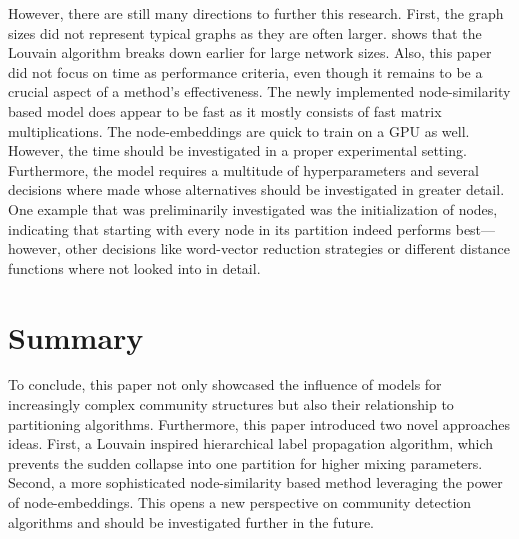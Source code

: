 \documentclass[11pt, twocolumn]{article}
\begin{document}
However, there are still many directions to further this research. First, the graph sizes did not represent typical graphs as they are often larger. \citeauthor{lancichinetti_CommunityDetectionAlgorithms_2009} shows that the Louvain algorithm breaks down earlier for large network sizes. Also, this paper did not focus on time as performance criteria, even though it remains to be a crucial aspect of a method's effectiveness. The newly implemented node-similarity based model does appear to be fast as it mostly consists of fast matrix multiplications. The node-embeddings are quick to train on a GPU as well. However, the time should be investigated in a proper experimental setting. Furthermore, the model requires a multitude of hyperparameters and several decisions where made whose alternatives should be investigated in greater detail. One example that was preliminarily investigated was the initialization of nodes, indicating that starting with every node in its partition indeed performs best—however, other decisions like word-vector reduction strategies or different distance functions where not looked into in detail.

\section{Summary}
\label{sec:summary}
To conclude, this paper not only showcased the influence of models for increasingly complex community structures but also their relationship to partitioning algorithms. Furthermore, this paper introduced two novel approaches ideas. First, a Louvain inspired hierarchical label propagation algorithm, which prevents the sudden collapse into one partition for higher mixing parameters. Second, a more sophisticated node-similarity based method leveraging the power of node-embeddings. This opens a new perspective on community detection algorithms and should be investigated further in the future. 

\newpage
\appendix
\end{document}
